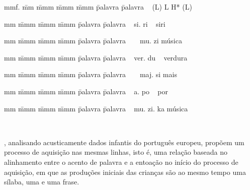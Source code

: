 \documentclass[output=paper]{LSP/langsci}
\begin{document}
\begin{minipage}{\linewidth}%
\begin{tabbing}
mmf. \= mm \= mmm \= mmm \= mmm \quad \= palavra \quad \= palavra \kill
~ \> (L) \> L \> H* \> (L) \> ~ \> ~
\end{tabbing}
\ea\label{ex:santana_25}
\begin{tabbing}
mm \= mmm \= mmm \= mmm \quad \= palavra \quad \= palavra \kill
~ \> si. \> ri \> ~ \> \ipa{[si.\pstr Ri]} \> siri
\end{tabbing}
\z
\ea\label{ex:santana_26}
\begin{tabbing}
mm \= mmm \= mmm \= mmm \quad \= palavra \quad \= palavra \kill
~ \> ~ \> mu. \> zi \> \ipa{[\pstr mu.zi]} \> música
\end{tabbing}
\z
\ea\label{ex:santana_27}
\begin{tabbing}
mm \= mmm \= mmm \= mmm \quad \= palavra \quad \= palavra \kill
~ \> ver. \> du \> ~ \>  \> verdura
\end{tabbing}
\z
\ea\label{ex:santana_28}
\begin{tabbing}
mm \= mmm \= mmm \= mmm \quad \= palavra \quad \= palavra \kill
~ \> ~ \> maj. \> si \>  \> mais
\end{tabbing}
\z
\ea\label{ex:santana_29}
\begin{tabbing}
mm \= mmm \= mmm \= mmm \quad \= palavra \quad \= palavra \kill
~ \> a. \> po \> ~ \> \ipa{[a.\pstr po]} \> por
\end{tabbing}
\z
\ea\label{ex:santana_30}
\begin{tabbing}
mm \= mmm \= mmm \= mmm \quad \= palavra \quad \= palavra \kill
~ \> mu. \> zi. \> ka \> \ipa{[mu.\pstr zi.ka]} \> música
\end{tabbing}
\z
~
\end{minipage}

\citet{frotavigario2008}, analisando acusticamente dados infantis do português europeu, propõem um processo de aquisição nas mesmas linhas, isto é, uma relação baseada no alinhamento entre o acento de palavra e a entoação no início do processo de aquisição, em que as produções iniciais das crianças são ao mesmo tempo uma sílaba, uma  e uma frase.
\end{document}
